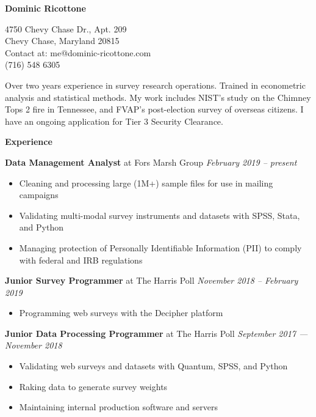 \documentclass[12pt]{article}
\newenvironment{details}{
\begin{itemize}[label={}]
	\small \setlength{\itemsep}{0pt}
}{\end{itemize}}
\begin{document}
\centering \Huge
\textbf{Dominic Ricottone}

\footnotesize
\begin{multicols}{2}
4750 Chevy Chase Dr., Apt. 209 \\
Chevy Chase, Maryland 20815 \\
Contact at: me@dominic-ricottone.com \\
(716) 548 6305
\end{multicols}

\vspace{.1in}
\normalsize
\begin{flushleft}
Over two years experience in survey research operations. Trained in econometric 
analysis and statistical methods. My work includes NIST's study on the Chimney 
Tops 2 fire in Tennessee, and FVAP's post-election survey of overseas citizens. 
I have an ongoing application for Tier 3 Security Clearance.
\end{flushleft}

\vspace{.1in}
\large
\textbf{Experience} \hrulefill
\vspace{.05in}

\normalsize
\textbf{Data Management Analyst} at Fors Marsh Group \hfill \textit{February 2019 -- present}
\begin{details}
 	\item Cleaning and processing large (1M+) sample files for use in mailing campaigns
	\item Validating multi-modal survey instruments and datasets with SPSS, Stata, and Python
	\item Managing protection of Personally Identifiable Information (PII) to comply with federal and IRB regulations
\end{details}

\normalsize
\textbf{Junior Survey Programmer} at The Harris Poll \hfill \textit{November 2018 -- February 2019}
\begin{details}
 	\item Programming web surveys with the Decipher platform
\end{details}

\normalsize
\textbf{Junior Data Processing Programmer} at The Harris Poll \hfill \textit{September 2017 --- November 2018}
\begin{details}
	\item Validating web surveys and datasets with Quantum, SPSS, and Python
 	\item Raking data to generate survey weights
	\item Maintaining internal production software and servers
\end{details}
\end{document}
